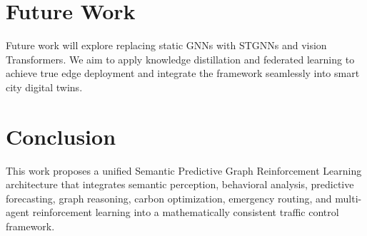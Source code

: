 \documentclass{ieeeaccess}
\begin{document}
\section{Future Work}
\label{sec:future_work}
Future work will explore replacing static GNNs with STGNNs and vision Transformers. We aim to apply knowledge distillation and federated learning to achieve true edge deployment and integrate the framework seamlessly into smart city digital twins.

\section{Conclusion}
\label{sec:conclusion}
This work proposes a unified Semantic Predictive Graph Reinforcement Learning architecture that integrates semantic perception, behavioral analysis, predictive forecasting, graph reasoning, carbon optimization, emergency routing, and multi-agent reinforcement learning into a mathematically consistent traffic control framework.



\end{document}
